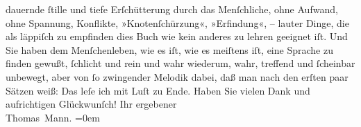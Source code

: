 \begin{ledgroupsized}[t]{13cm}
               dauernde ſtille und tiefe Erſchütterung durch das {\pb}Menſchliche, ohne Aufwand, ohne Spannung,
               Konflikte, »Knotenſchürzung«, »Erfindung«, – lauter Dinge, die als läppiſch zu
               empfinden dies Buch wie kein
               anderes zu lehren geeignet iſt. Und Sie haben dem Menſchenleben, wie es iſt, wie es
               meiſtens iſt, eine Sprache zu finden gewußt, ſchlicht und rein und wahr wiederum,
               wahr, treffend und ſcheinbar unbewegt, aber von ſo zwingender Melodik dabei, daß man
               nach den erſten paar Sätzen weiß: Das leſe ich mit Luſt zu Ende. Haben Sie vielen
               Dank und aufrichtigen Glückwunſch!\pend
           \pstart
           Ihr ergebener{\\[\baselineskip]}\spacefill\mbox{Thomas Mann.}\pend
           \leftskip=0em{}
         
         \endnumbering{}\end{ledgroupsized}  \newcommand{\dateiname}{L02501}\newcommand{\titel}{Thomas Mann an Arthur Schnitzler, 28. 5. 1928}\newcommand{\editorInnen}{Martin Anton Müller und Gerd-Hermann Susen}
      